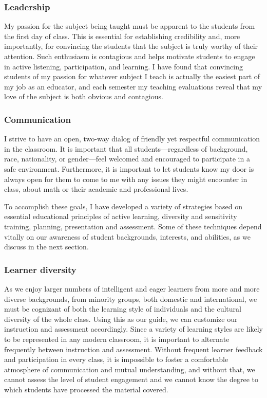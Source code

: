  \subsubsection{Leadership}
My passion for the subject being taught must be
apparent to the students from the first day of class. 
This is essential for establishing credibility and, more importantly,
for convincing the students that the subject is truly worthy of
their attention.
Such enthusiasm is contagious and helps motivate students to engage in
active listening, participation, and learning.
I have found that convincing students of my passion for
whatever subject I teach is actually the easiest part of my
job as an educator, and each semester my teaching evaluations reveal
that my love of the subject is both obvious and contagious.

\subsubsection{Communication}  I strive to have an open, two-way
dialog of friendly yet respectful communication in the classroom.
It is important that all students---regardless of background, race,
nationality, or gender---feel welcomed and encouraged to participate in a safe environment.
Furthermore, it is important to let students know my door is always
open for them to come to me with any issues they might encounter in
class, about math or their academic and professional lives.

To accomplish these goals, I have developed a variety of strategies
based on essential educational principles of active
learning, diversity and sensitivity training, planning,
presentation and assessment.
Some of these techniques depend vitally on our awareness of
student backgrounds, interests, and abilities, as we discuss in the
next section.

\subsubsection{Learner diversity}
As we enjoy larger numbers of intelligent and eager learners from
more and more diverse backgrounds, from minority groups, both domestic and 
international, we must be cognizant of 
both the learning style of individuals and the
cultural diversity of the whole class. Using this as our guide,
we can customize our instruction and assessment accordingly.
Since a variety of learning styles are likely
to be represented in any modern classroom,
it is important to alternate frequently between instruction and
assessment.
Without frequent learner feedback and participation in every class,
it is impossible to foster a comfortable atmosphere of 
communication and mutual understanding, and without that, we cannot
assess the level of student engagement and we cannot know the degree
to which students have processed the material covered.


